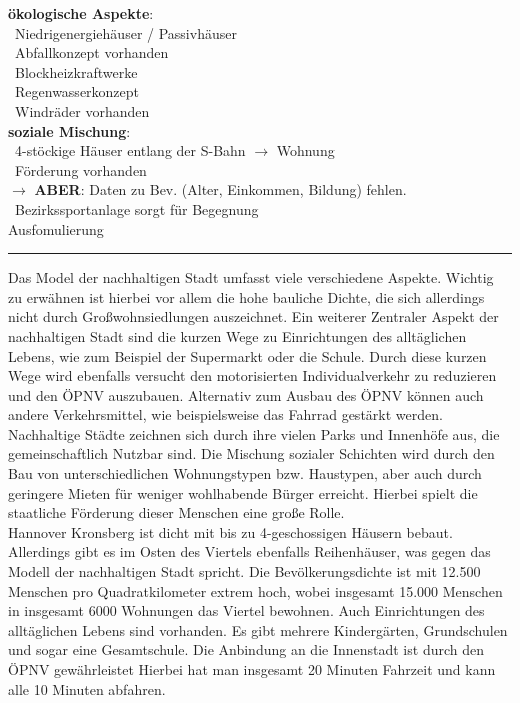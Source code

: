 \documentclass[12pt,a4paper]{report}
\newcommand{\psx}[0]{\color{green!100}{$(+)$}\color{black}\ }
\begin{document}
	\textbf{ökologische Aspekte}: \\
	\psx Niedrigenergiehäuser / Passivhäuser \\
	\psx Abfallkonzept vorhanden \\
	\psx Blockheizkraftwerke \\
	\psx Regenwasserkonzept \\
	\psx Windräder vorhanden 
	\\
	\textbf{soziale Mischung}: \\
	\psx 4-stöckige Häuser entlang der S-Bahn $\to$ Wohnung \\
	\psx Förderung vorhanden \\
	$\to$ \textbf{ABER}: Daten zu Bev. (Alter, Einkommen, Bildung) fehlen. \\
	\psx Bezirkssportanlage sorgt für Begegnung
	\\[0.5cm]
	\Large
	Ausfomulierung
	\hrule
	\vspace{0.25cm}
	\large
	\noindent
	Das Model der nachhaltigen Stadt umfasst viele verschiedene Aspekte.
	Wichtig zu erwähnen ist hierbei vor allem die hohe bauliche Dichte, die sich allerdings nicht durch Großwohnsiedlungen auszeichnet.
	Ein weiterer Zentraler Aspekt der nachhaltigen Stadt sind die kurzen Wege zu Einrichtungen des alltäglichen Lebens, wie zum Beispiel der Supermarkt oder die Schule.
	Durch diese kurzen Wege wird ebenfalls versucht den motorisierten Individualverkehr zu reduzieren und den ÖPNV auszubauen.
	Alternativ zum Ausbau des ÖPNV können auch andere Verkehrsmittel, wie beispielsweise das Fahrrad gestärkt werden.
	Nachhaltige Städte zeichnen sich durch ihre vielen Parks und Innenhöfe aus, die gemeinschaftlich Nutzbar sind.
	Die Mischung sozialer Schichten wird durch den Bau von unterschiedlichen Wohnungstypen bzw. Haustypen, aber auch durch geringere Mieten für weniger wohlhabende Bürger erreicht.
	Hierbei spielt die staatliche Förderung dieser Menschen eine große Rolle. \\
	Hannover Kronsberg ist dicht mit bis zu 4-geschossigen Häusern bebaut.
	Allerdings gibt es im Osten des Viertels ebenfalls Reihenhäuser, was gegen das Modell der nachhaltigen Stadt spricht.
	Die Bevölkerungsdichte ist mit 12.500 Menschen pro Quadratkilometer extrem hoch, wobei insgesamt 15.000 Menschen in insgesamt 6000 Wohnungen das Viertel bewohnen.
	Auch Einrichtungen des alltäglichen Lebens sind vorhanden.
	Es gibt mehrere Kindergärten, Grundschulen und sogar eine Gesamtschule.
	Die Anbindung an die Innenstadt ist durch den ÖPNV gewährleistet
	Hierbei hat man insgesamt 20 Minuten Fahrzeit und kann alle 10 Minuten abfahren.
\end{document}
